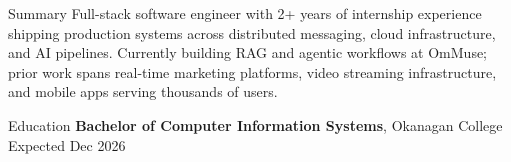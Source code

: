 \documentclass{resume}
\begin{document}
\vspace{-.5em}
\begin{rSection}{Summary}
{\scriptsize Full-stack software engineer with 2+ years of internship experience shipping production systems across distributed messaging, cloud infrastructure, and AI pipelines. Currently building RAG and agentic workflows at OmMuse; prior work spans real-time marketing platforms, video streaming infrastructure, and mobile apps serving thousands of users.}
\end{rSection}\vspace{-0.6em}


\begin{rSection}{Education}
{\scriptsize \textbf{Bachelor of Computer Information Systems}, Okanagan College \hfill Expected Dec 2026}
\end{rSection}\vspace{-0.5em}
\end{document}
